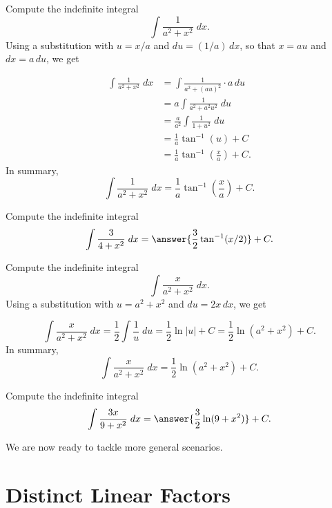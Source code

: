 \documentclass{ximera}
\begin{document}
\begin{example}
Compute the indefinite integral
\[
\int \frac{1}{a^2 + x^2} \; dx.
\]
Using a substitution with $u = x/a$ and $du = (1/a) \, dx$, so that $x = au$ and $dx = a \, du$, we get

\begin{align*}
 \int \frac{1}{a^2 + x^2} \; dx &= \int \frac{1}{a^2 + (au)^2} \cdot a\, du   \\
 &= a\int \frac{1}{a^2 + a^2u^2} \; du   \\
 &= \frac{a}{a^2} \int \frac{1}{1+u^2} \; du \\
 &= \frac{1}{a} \tan^{-1}(u) + C \\
 &= \frac{1}{a} \tan^{-1}\left(\frac{x}{a}\right) + C.
 \end{align*}
 In summary,
 \[
\int \frac{1}{a^2 + x^2} \; dx =  \frac{1}{a} \tan^{-1}\left(\frac{x}{a}\right) + C.
\]
 \end{example}
 
 \begin{problem}
 Compute the indefinite integral
 \[
 \int \frac{3}{4+x^2} \; dx = \answer{\frac32 \tan^{-1}(x/2)} + C.
\]

 \end{problem}
 
 
\begin{example}
Compute the indefinite integral
\[
\int \frac{x}{a^2 + x^2} \; dx.
\]
Using a substitution with $u = a^2 + x^2$ and $du = 2x \, dx$, we get

 \[
 \int \frac{x}{a^2 + x^2} \; dx = \frac12 \int \frac{1}{u} \; du   =  \frac{1}{2} \ln|u| + C =    
 \frac{1}{2} \ln(a^2 + x^2) + C.
 \]
 In summary,
 \[
\int \frac{x}{a^2 + x^2} \; dx =  \frac{1}{2}\ln(a^2 + x^2)  + C.
\]
 \end{example}
 
 \begin{problem}
 Compute the indefinite integral
 \[
 \int \frac{3x}{9+x^2} \; dx = \answer{\frac32 \ln(9+ x^2)} + C.
\]

 \end{problem}
               
                    
We are now ready to tackle more general scenarios.

\section{Distinct Linear Factors}
\end{document}
